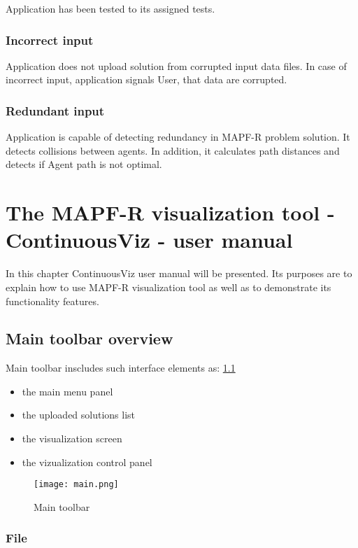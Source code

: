 \documentclass[thesis=B,english]{FITthesis}[2019/12/23]
\begin{document}
Application has been tested to its assigned tests.

\subsection{Incorrect input}

Application does not upload solution from corrupted input data files. In case of incorrect input, application signals User, that data are corrupted. 

\subsection{Redundant input}

Application is capable of detecting redundancy in MAPF-R problem solution. It detects collisions between agents. In addition, it calculates path distances and detects if Agent path is not optimal.  


\chapter{The MAPF-R visualization tool - ContinuousViz - user manual}

In this chapter ContinuousViz user manual will be presented. Its purposes are to explain how to use MAPF-R visualization tool as well as to demonstrate its functionality features. 

\section{Main toolbar overview}

Main toolbar inscludes such interface elements as: \ref{fig:float19} 
\begin{itemize}
\item the main menu panel
\item the uploaded solutions list
\item the visualization screen 
\item the vizualization control panel
\end{itemize}

\begin{figure}
	\texttt{[image: main.png]}
	\caption[Main toolbar]{Main toolbar}\label{fig:float19}
\end{figure}


\subsection{File}
\end{document}
